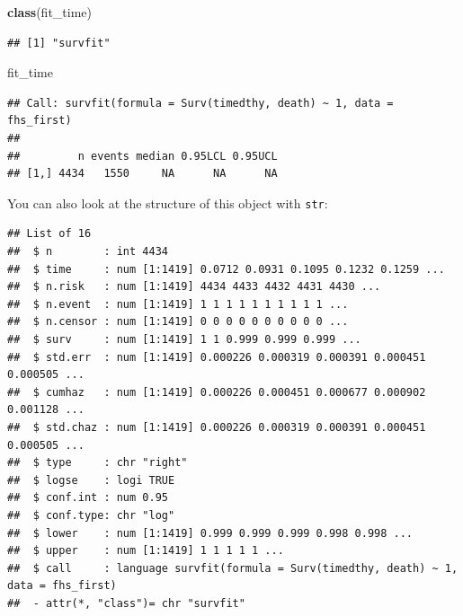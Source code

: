\documentclass[
]{book}
\newenvironment{Shaded}{\begin{snugshade}}{\end{snugshade}}
\newcommand{\KeywordTok}[1]{\textcolor[rgb]{0.13,0.29,0.53}{\textbf{#1}}}
\newcommand{\NormalTok}[1]{#1}
\newcommand{\OperatorTok}[1]{\textcolor[rgb]{0.81,0.36,0.00}{\textbf{#1}}}
\newcommand{\StringTok}[1]{\textcolor[rgb]{0.31,0.60,0.02}{#1}}
\begin{document}
\begin{Shaded}
\begin{Highlighting}[]
\KeywordTok{class}\NormalTok{(fit_time)}
\end{Highlighting}
\end{Shaded}

\begin{verbatim}
## [1] "survfit"
\end{verbatim}

\begin{Shaded}
\begin{Highlighting}[]
\NormalTok{fit_time}
\end{Highlighting}
\end{Shaded}

\begin{verbatim}
## Call: survfit(formula = Surv(timedthy, death) ~ 1, data = fhs_first)
## 
##         n events median 0.95LCL 0.95UCL
## [1,] 4434   1550     NA      NA      NA
\end{verbatim}

You can also look at the structure of this object with \texttt{str}:

\begin{Shaded}
\end{Shaded}

\begin{verbatim}
## List of 16
##  $ n        : int 4434
##  $ time     : num [1:1419] 0.0712 0.0931 0.1095 0.1232 0.1259 ...
##  $ n.risk   : num [1:1419] 4434 4433 4432 4431 4430 ...
##  $ n.event  : num [1:1419] 1 1 1 1 1 1 1 1 1 1 ...
##  $ n.censor : num [1:1419] 0 0 0 0 0 0 0 0 0 0 ...
##  $ surv     : num [1:1419] 1 1 0.999 0.999 0.999 ...
##  $ std.err  : num [1:1419] 0.000226 0.000319 0.000391 0.000451 0.000505 ...
##  $ cumhaz   : num [1:1419] 0.000226 0.000451 0.000677 0.000902 0.001128 ...
##  $ std.chaz : num [1:1419] 0.000226 0.000319 0.000391 0.000451 0.000505 ...
##  $ type     : chr "right"
##  $ logse    : logi TRUE
##  $ conf.int : num 0.95
##  $ conf.type: chr "log"
##  $ lower    : num [1:1419] 0.999 0.999 0.999 0.998 0.998 ...
##  $ upper    : num [1:1419] 1 1 1 1 1 ...
##  $ call     : language survfit(formula = Surv(timedthy, death) ~ 1, data = fhs_first)
##  - attr(*, "class")= chr "survfit"
\end{verbatim}
\end{document}
